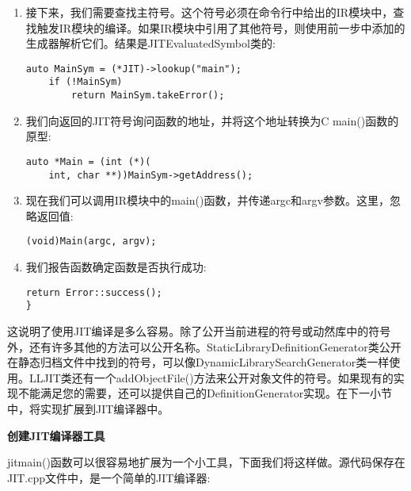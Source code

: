\begin{enumerate}
\item 接下来，我们需要查找主符号。这个符号必须在命令行中给出的IR模块中，查找触发IR模块的编译。如果IR模块中引用了其他符号，则使用前一步中添加的生成器解析它们。结果是JITEvaluatedSymbol类的:
\begin{lstlisting}[caption={}]
	auto MainSym = (*JIT)->lookup("main");
	if (!MainSym)
		return MainSym.takeError();
\end{lstlisting}

\item 我们向返回的JIT符号询问函数的地址，并将这个地址转换为C main()函数的原型:
\begin{lstlisting}[caption={}]
auto *Main = (int (*)(
	int, char **))MainSym->getAddress();
\end{lstlisting}

\item 现在我们可以调用IR模块中的main()函数，并传递argc和argv参数。这里，忽略返回值:
\begin{lstlisting}[caption={}]
	(void)Main(argc, argv);
\end{lstlisting}

\item 我们报告函数确定函数是否执行成功:
\begin{lstlisting}[caption={}]
	return Error::success();
}
\end{lstlisting}

\end{enumerate}

这说明了使用JIT编译是多么容易。除了公开当前进程的符号或动然库中的符号外，还有许多其他的方法可以公开名称。StaticLibraryDefinitionGenerator类公开在静态归档文件中找到的符号，可以像DynamicLibrarySearchGenerator类一样使用。LLJIT类还有一个addObjectFile()方法来公开对象文件的符号。如果现有的实现不能满足您的需要，还可以提供自己的DefinitionGenerator实现。在下一小节中，将实现扩展到JIT编译器中。\par

\hspace*{\fill} \par %
\textbf{创建JIT编译器工具}

jitmain()函数可以很容易地扩展为一个小工具，下面我们将这样做。源代码保存在JIT.cpp文件中，是一个简单的JIT编译器:\par

